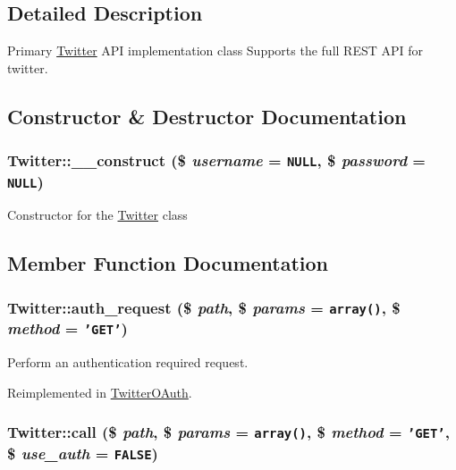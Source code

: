 \subsection{Detailed Description}
Primary \hyperlink{classTwitter}{Twitter} API implementation class Supports the full REST API for twitter. 

\subsection{Constructor \& Destructor Documentation}
\hypertarget{classTwitter_27a3a1498c3269a212e5907ffa8c6feb}{
\subsubsection[{\_\-\_\-construct}]{\setlength{\rightskip}{0pt plus 5cm}Twitter::\_\-\_\-construct (\$ {\em username} = {\tt NULL}, \/  \$ {\em password} = {\tt NULL})}}
\label{classTwitter_27a3a1498c3269a212e5907ffa8c6feb}


Constructor for the \hyperlink{classTwitter}{Twitter} class 

\subsection{Member Function Documentation}
\hypertarget{classTwitter_be4761ddb2a687520077da1748675edd}{
\subsubsection[{auth\_\-request}]{\setlength{\rightskip}{0pt plus 5cm}Twitter::auth\_\-request (\$ {\em path}, \/  \$ {\em params} = {\tt array()}, \/  \$ {\em method} = {\tt 'GET'})}}
\label{classTwitter_be4761ddb2a687520077da1748675edd}


Perform an authentication required request. 

Reimplemented in \hyperlink{classTwitterOAuth_186e14f18c9097450c53892405600b86}{TwitterOAuth}.\hypertarget{classTwitter_0e92b39735606e39b14634ece323481f}{
\subsubsection[{call}]{\setlength{\rightskip}{0pt plus 5cm}Twitter::call (\$ {\em path}, \/  \$ {\em params} = {\tt array()}, \/  \$ {\em method} = {\tt 'GET'}, \/  \$ {\em use\_\-auth} = {\tt FALSE})}}
\label{classTwitter_0e92b39735606e39b14634ece323481f}


